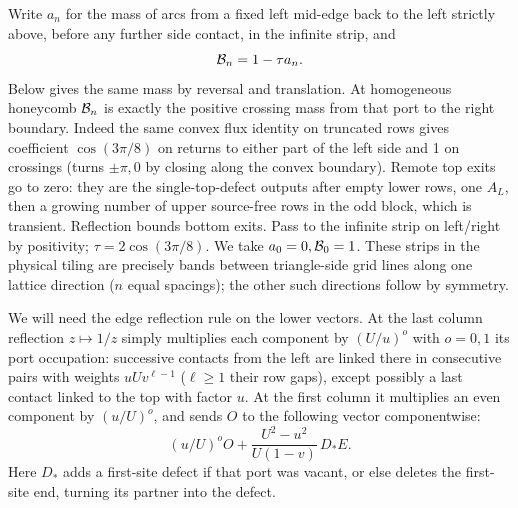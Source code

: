 Write \(a_n\) for the mass of arcs from a fixed left mid-edge back to the left strictly above, before any further side contact, in the infinite strip, and
\[
 {\cal B}_n=1-\tau a_n.
\]
Below gives the same mass by reversal and translation. At homogeneous honeycomb \({\cal B}_n\) is exactly the positive crossing mass from that port to the right boundary. Indeed the same convex flux identity on truncated rows gives coefficient \(\cos(3\pi/8)\) on returns to either part of the left side and 1 on crossings (turns \(\pm\pi,0\) by closing along the convex boundary). Remote top exits go to zero: they are the single-top-defect outputs after empty lower rows, one \(A_L\), then a growing number of upper source-free rows in the odd block, which is transient. Reflection bounds bottom exits. Pass to the infinite strip on left/right by positivity; \(\tau=2\cos(3\pi/8)\). We take \(a_0=0,{\cal B}_0=1\).
These strips in the physical tiling are precisely bands between triangle-side grid lines along one lattice direction (\(n\) equal spacings); the other such directions follow by symmetry.

We will need the edge reflection rule on the lower vectors. At the last column reflection \(z\mapsto1/z\) simply multiplies each component by \((U/u)^{o}\) with \(o=0,1\) its port occupation: successive contacts from the left are linked there in consecutive pairs with weights \(uU v^{\ell-1}\) (\(\ell\ge1\) their row gaps), except possibly a last contact linked to the top with factor \(u\). At the first column it multiplies an even component by \((u/U)^o\), and sends \(O\) to the following vector componentwise:
\[
 (u/U)^o O+\frac{U^2-u^2}{U(1-v)}\,D_* E.
\]
Here \(D_*\) adds a first-site defect if that port was vacant, or else deletes the first-site end, turning its partner into the defect.

